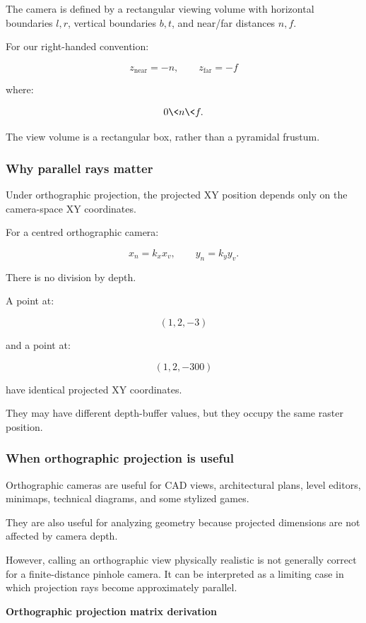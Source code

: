 The camera is defined by a rectangular viewing volume with horizontal boundaries \(l,r\), vertical boundaries \(b,t\), and near/far distances \(n,f\).

For our right-handed convention:

\[
 z_{\mathrm{near}}=-n, \qquad z_{\mathrm{far}}=-f
\]

where:

\[
 0\<n\<f.
\]

The view volume is a rectangular box, rather than a pyramidal frustum.

\subsubsection{Why parallel rays matter}\label{why-parallel-rays-matter}

Under orthographic projection, the projected XY position depends only on the camera-space XY coordinates.

For a centred orthographic camera:

\[
 x_n=k_xx_v, \qquad y_n=k_yy_v.
\]

There is no division by depth.

A point at:

\[
 (1,2,-3)
\]

and a point at:

\[
 (1,2,-300)
\]

have identical projected XY coordinates.

They may have different depth-buffer values, but they occupy the same raster position.

\subsubsection{When orthographic projection is useful}\label{when-orthographic-projection-is-useful}

Orthographic cameras are useful for CAD views, architectural plans, level editors, minimaps, technical diagrams, and some stylized games.

They are also useful for analyzing geometry because projected dimensions are not affected by camera depth.

However, calling an orthographic view physically realistic is not generally correct for a finite-distance pinhole camera. It can be interpreted as a limiting case in which projection rays become approximately parallel.

\textbf{Orthographic projection matrix derivation}

